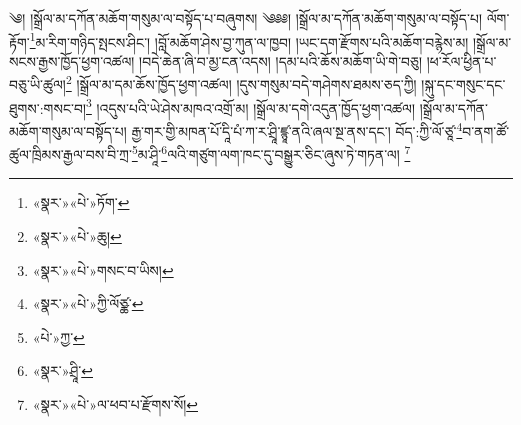 ༄། །སྒྲོལ་མ་དཀོན་མཆོག་གསུམ་ལ་བསྟོད་པ་བཞུགས། ༄༅༅། །སྒྲོལ་མ་དཀོན་མཆོག་གསུམ་ལ་བསྟོད་པ། ལོག་རྟོག་\footnote{«སྣར་»«པེ་»ཏོག་}མ་རིག་གཉིད་སྤངས་ཤིང་། །བློ་མཆོག་ཤེས་བྱ་ཀུན་ལ་ཁྱབ། །ཡང་དག་རྫོགས་པའི་མཆོག་བརྙེས་མ། །སྒྲོལ་མ་སངས་རྒྱས་ཁྱོད་ཕྱག་འཚལ། །བདེ་ཆེན་ཞི་བ་མྱ་ངན་འདས། །དམ་པའི་ཆོས་མཆོག་ཡི་གེ་བཅུ། །ཕ་རོལ་ཕྱིན་པ་བཅུ་ཡི་ཚུལ།\footnote{«སྣར་»«པེ་»ཆུ།} །སྒྲོལ་མ་དམ་ཆོས་ཁྱོད་ཕྱག་འཚལ། །དུས་གསུམ་བདེ་གཤེགས་ཐམས་ཅད་ཀྱི། །སྐུ་དང་གསུང་དང་ཐུགས་:གསང་བ།\footnote{«སྣར་»«པེ་»གསང་བ་ཡིས།} །འདུས་པའི་ཡེ་ཤེས་མཁའ་འགྲོ་མ། །སྒྲོལ་མ་དགེ་འདུན་ཁྱོད་ཕྱག་འཚལ། །སྒྲོལ་མ་དཀོན་མཆོག་གསུམ་ལ་བསྟོད་པ། རྒྱ་གར་གྱི་མཁན་པོ་དཱི་པཾ་ཀ་ར་ཤྲཱི་ཛྙཱ་ནའི་ཞལ་སྔ་ནས་དང་། བོད་:ཀྱི་ལོ་ཙཱ་\footnote{«སྣར་»«པེ་»ཀྱི་ལོཙྪ་}བ་ནག་ཚོ་ཚུལ་ཁྲིམས་རྒྱལ་བས་བི་ཀྲ་\footnote{«པེ་»ཀྱ་}མ་ཤཱི་\footnote{«སྣར་»ཤྲཱི་}ལའི་གཙུག་ལག་ཁང་དུ་བསྒྱུར་ཅིང་ཞུས་ཏེ་གཏན་ལ། \footnote{«སྣར་»«པེ་»ལ་ཕབ་པ་རྫོགས་སོ། }